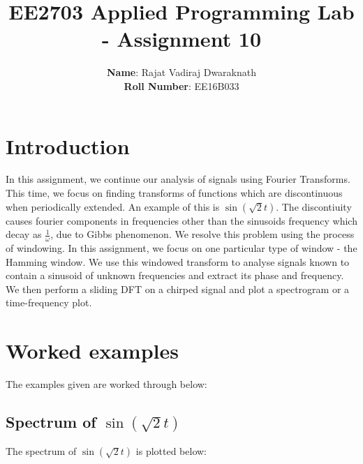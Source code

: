 \documentclass[11pt]{article}
\title{EE2703 Applied Programming Lab - Assignment 10}
\author{
  \textbf{Name}: Rajat Vadiraj Dwaraknath\\
  \textbf{Roll Number}: EE16B033
}
\begin{document}
    
    
    \maketitle
    
    

    
	

	
		
    \section{Introduction}\label{introduction}

In this assignment, we continue our analysis of signals using Fourier
Transforms. This time, we focus on finding transforms of functions which
are discontinuous when periodically extended. An example of this is
\(\sin(\sqrt{2} t)\). The discontiuity causes fourier components in
frequencies other than the sinusoids frequency which decay as
\(\frac{1}{\omega}\), due to Gibbs phenomenon. We resolve this problem
using the process of windowing. In this assignment, we focus on one
particular type of window - the Hamming window. We use this windowed
transform to analyse signals known to contain a sinusoid of unknown
frequencies and extract its phase and frequency. We then perform a
sliding DFT on a chirped signal and plot a spectrogram or a
time-frequency plot.

	

	

	

	

	
		
    \section{Worked examples}\label{worked-examples}

The examples given are worked through below:

	

	
		
    \subsection{\texorpdfstring{Spectrum of
\(\sin(\sqrt{2}t)\)}{Spectrum of \textbackslash{}sin(\textbackslash{}sqrt\{2\}t)}}\label{spectrum-of-sinsqrt2t}

	

	
		
    The spectrum of \(\sin(\sqrt{2}t)\) is plotted below:
\end{document}
